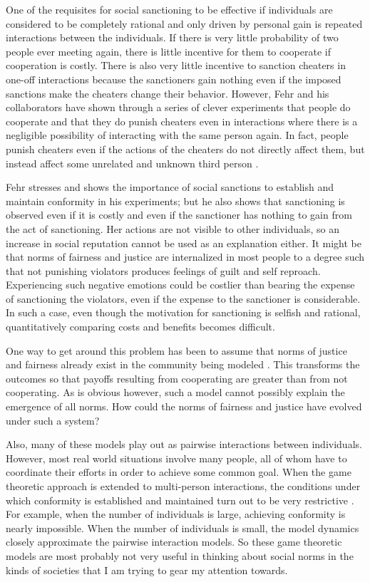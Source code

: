 \documentclass[rutwik_proposal.tex]{subfiles}
\begin{document}
One of the requisites for social sanctioning to be effective if individuals are considered to be completely rational and only driven by personal gain is repeated interactions between the individuals. If there is very little probability of two people ever meeting again, there is little incentive for them to cooperate if cooperation is costly. There is also very little incentive to sanction cheaters in one-off interactions because the sanctioners gain nothing even if the imposed sanctions make the cheaters change their behavior. However, Fehr and his collaborators have shown through a series of clever experiments that people do cooperate and that they do punish cheaters even in interactions where there is a negligible possibility of interacting with the same person again. In fact, people punish cheaters even if the actions of the cheaters do not directly affect them, but instead affect some unrelated and unknown third person \cite{Fehr02, Fehr03, Fehr04}.

Fehr stresses and shows the importance of social sanctions to establish and maintain conformity in his experiments; but he also shows that sanctioning is observed even if it is costly and even if the sanctioner has nothing to gain from the act of sanctioning. Her actions are not visible to other individuals, so an increase in social reputation cannot be used as an explanation either. It might be that norms of fairness and justice are internalized in most people to a degree such that not punishing violators produces feelings of guilt and self reproach. Experiencing such negative emotions could be costlier than bearing the expense of sanctioning the violators, even if the expense to the sanctioner is considerable. In such a case, even though the motivation for sanctioning is selfish and rational, quantitatively comparing costs and benefits becomes difficult.

One way to get around this problem has been to assume that norms of justice and fairness already exist in the community being modeled \cite{Bicchieri14}. This transforms the outcomes so that payoffs resulting from cooperating are greater than from not cooperating. As is obvious however, such a model cannot possibly explain the emergence of all norms. How could the norms of fairness and justice have evolved under such a system?

Also, many of these models play out as pairwise interactions between individuals. However, most real world situations involve many people, all of whom have to coordinate their efforts in order to achieve some common goal. When the game theoretic approach is extended to multi-person interactions, the conditions under which conformity is established and maintained turn out to be very restrictive \cite{Boyd88}. For example, when the number of individuals is large, achieving conformity is nearly impossible. When the number of individuals is small, the model dynamics closely approximate the pairwise interaction models. So these game theoretic models are most probably not very useful in thinking about social norms in the kinds of societies that I am trying to gear my attention towards.
\end{document}
